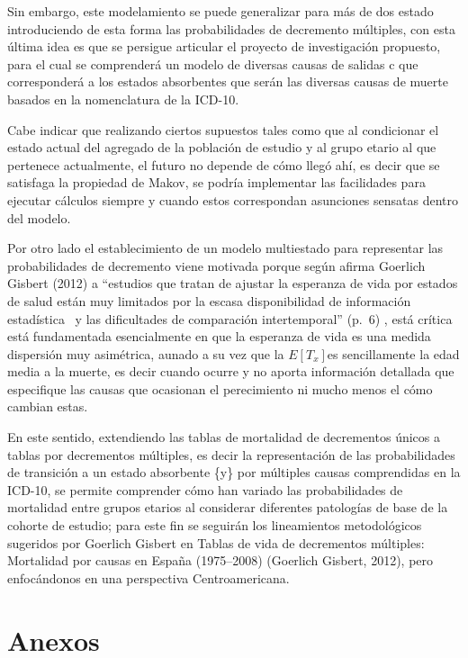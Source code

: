 \documentclass[
  letterpaper,
  DIV=11,
  numbers=noendperiod]{scrartcl}
\begin{document}
Sin embargo, este modelamiento se puede generalizar para más de dos
estado introduciendo de esta forma las probabilidades de decremento
múltiples, con esta última idea es que se persigue articular el proyecto
de investigación propuesto, para el cual se comprenderá un modelo de
diversas causas de salidas c que corresponderá a los estados absorbentes
que serán las diversas causas de muerte basados en la nomenclatura de la
ICD-10.

Cabe indicar que realizando ciertos supuestos tales como que al
condicionar el estado actual del agregado de la población de estudio y
al grupo etario al que pertenece actualmente, el futuro no depende de
cómo llegó ahí, es decir que se satisfaga la propiedad de Makov, se
podría implementar las facilidades para ejecutar cálculos siempre y
cuando estos correspondan asunciones sensatas dentro del modelo.~

Por otro lado el establecimiento de un modelo multiestado para
representar las probabilidades de decremento viene motivada porque según
afirma Goerlich Gisbert (2012) a ``estudios que tratan de ajustar la
esperanza de vida por estados de salud están muy limitados por la escasa
disponibilidad de información estadística~ y las dificultades de
comparación intertemporal'' (p.~6) , está crítica está fundamentada
esencialmente en que la esperanza de vida es una medida dispersión muy
asimétrica, aunado a su vez que la \(E[T_{x}]\)es sencillamente la edad
media a la muerte, es decir cuando ocurre y no aporta información
detallada que especifique las causas que ocasionan el perecimiento ni
mucho menos el cómo cambian estas.

En este sentido, extendiendo las tablas de mortalidad de decrementos
únicos a tablas por decrementos múltiples, es decir la representación de
las probabilidades de transición a un estado absorbente \{y\} por
múltiples causas comprendidas en la ICD-10, se permite comprender cómo
han variado las probabilidades de mortalidad entre grupos etarios al
considerar diferentes patologías de base de la cohorte de estudio; para
este fin se seguirán los lineamientos metodológicos sugeridos por
Goerlich Gisbert en Tablas de vida de decrementos múltiples: Mortalidad
por causas en España (1975--2008) (Goerlich Gisbert, 2012), pero
enfocándonos en una perspectiva Centroamericana.

\newpage

\section{Anexos}\label{anexos}
\end{document}
